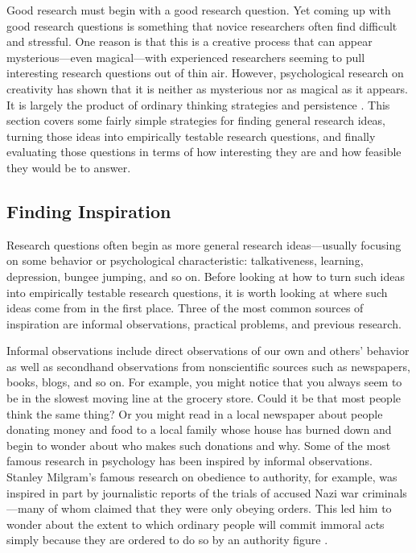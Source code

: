 Good research must begin with a good research question. Yet coming up with good research questions is something that novice researchers often find difficult and stressful. One reason is that this is a creative process that can appear mysterious---even magical---with experienced researchers seeming to pull interesting research questions out of thin air. However, psychological research on creativity has shown that it is neither as mysterious nor as magical as it appears. It is largely the product of ordinary thinking strategies and persistence \citep{weisberg_creativity:_1993}. This section covers some fairly simple strategies for finding general research ideas, turning those ideas into empirically testable research questions, and finally evaluating those questions in terms of how interesting they are and how feasible they would be to answer.

\subsection{Finding Inspiration}

Research questions often begin as more general research ideas---usually focusing on some behavior or psychological characteristic: talkativeness, learning, depression, bungee jumping, and so on. Before looking at how to turn such ideas into empirically testable research questions, it is worth looking at where such ideas come from in the first place. Three of the most common sources of inspiration are informal observations, practical problems, and previous research.

Informal observations include direct observations of our own and others' behavior as well as secondhand observations from nonscientific sources such as newspapers, books, blogs, and so on. For example, you might notice that you always seem to be in the slowest moving line at the grocery store. Could it be that most people think the same thing? Or you might read in a local newspaper about people donating money and food to a local family whose house has burned down and begin to wonder about who makes such donations and why. Some of the most famous research in psychology has been inspired by informal observations. Stanley Milgram's famous research on obedience to authority, for example, was inspired in part by journalistic reports of the trials of accused Nazi war criminals---many of whom claimed that they were only obeying orders. This led him to wonder about the extent to which ordinary people will commit immoral acts simply because they are ordered to do so by an authority figure \citep{milgram_behavioral_1963}.


